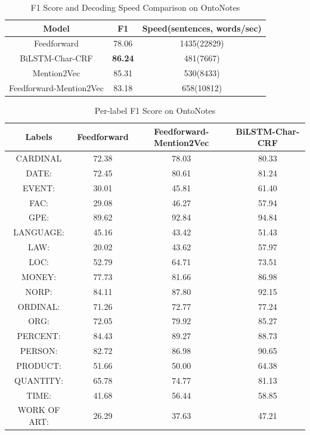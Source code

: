 \begin{table}[]
\centering
\caption{F1 Score and Decoding Speed Comparison on OntoNotes}
\label{table:ner-mention2vec2}
\begin{tabular}{|c|c|c|}
\hline
Model       & F1     & Speed(sentences, words/sec) \\ \hline
Feedforward      & 78.06  & 1435(22829) \\ \hline
BiLSTM-Char-CRF  & \textbf{86.24} & 481(7667)     \\ \hline
Mention2Vec      & 85.31 &   530(8433)          \\ \hline
Feedforward-Mention2Vec  & 83.18  &  658(10812) \\ \hline
\end{tabular}
\end{table}


\begin{table}[]
\centering
\caption{Per-label F1 Score on OntoNotes}
\label{table:ner-mention2vec3}
\begin{tabular}{|c|c|c|c|}
\hline
Labels             & Feedforward & Feedforward-Mention2Vec & BiLSTM-Char-CRF \\ \hline
         CARDINAL  & 72.38  & 78.03  & 80.33 \\ \hline
             DATE: & 72.45  & 80.61  & 81.24 \\ \hline
            EVENT: & 30.01  & 45.81  & 61.40 \\ \hline
              FAC: & 29.08  & 46.27  & 57.94 \\ \hline
              GPE: & 89.62  & 92.84  & 94.84 \\ \hline
         LANGUAGE: & 45.16  & 43.42  & 51.43 \\ \hline
              LAW: & 20.02  & 43.62  & 57.97 \\ \hline
              LOC: & 52.79  & 64.71  & 73.51 \\ \hline
            MONEY: & 77.73  & 81.66  & 86.98 \\ \hline
             NORP: & 84.11  & 87.80  & 92.15 \\ \hline
          ORDINAL: & 71.26  & 72.77  & 77.24 \\ \hline
              ORG: & 72.05  & 79.92  & 85.27 \\ \hline
          PERCENT: & 84.43  & 89.27  & 88.73 \\ \hline
           PERSON: & 82.72  & 86.98  & 90.65 \\ \hline
          PRODUCT: & 51.66  & 50.00  & 64.38 \\ \hline
         QUANTITY: & 65.78  & 74.77  & 81.13 \\ \hline
             TIME: & 41.68  & 56.44  & 58.85 \\ \hline
      WORK OF ART: & 26.29  & 37.63  & 47.21 \\ \hline
\end{tabular}
\end{table}

